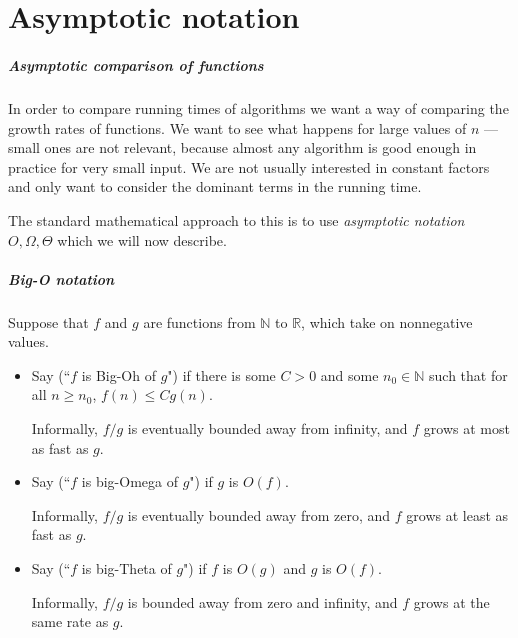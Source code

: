 \chapter{Asymptotic notation} %

\paragraph{Asymptotic comparison of functions}
In order to compare running times of algorithms we want a way of comparing
the growth rates of functions. We want to see what happens for large values of $n$ --- small ones are not
 relevant, because almost any algorithm is good enough in practice for very small input. 
 We are not usually interested in constant factors and only want to consider the 
dominant terms in the running time.

The standard mathematical approach to this is to use \emph{asymptotic notation}
$O, \Omega, \Theta$ which we will now describe.

\paragraph{Big-O notation}
\begin{Definition}

Suppose that $f$ and $g$ are functions from $\mathbb{N}$ to $\mathbb{R}$, 
which take on nonnegative values. 
\begin{itemize}
\item Say  (``$f$ is Big-Oh of $g$") if there is
some $C > 0$ and some $n_0 \in \mathbb{N}$ such that for all $n \geq
n_0$, $f(n) \leq C g(n)$. 

Informally, $f/g$ is eventually bounded away from infinity, and $f$ grows at most as fast as $g$.

\item Say  (``$f$ is big-Omega of $g$") if $g$ is
$O(f)$. 

Informally, $f/g$ is eventually bounded away from zero, and $f$ grows at least as fast as $g$.
\item Say  (``$f$ is big-Theta of $g$") if $f$ is 
$O(g)$ and $g$ is $O(f)$. 

Informally, $f/g$ is bounded away from zero and infinity, and $f$ grows at the same rate as $g$.
\end{itemize}
\end{Definition}



